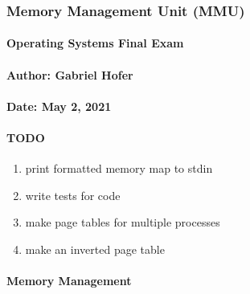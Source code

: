 \hypertarget{memory-management-unit-mmu}{%
\subsubsection{Memory Management Unit
(MMU)}\label{memory-management-unit-mmu}}

\hypertarget{operating-systems-final-exam}{%
\paragraph{Operating Systems Final
Exam}\label{operating-systems-final-exam}}

\hypertarget{author-gabriel-hofer}{%
\paragraph{Author: Gabriel Hofer}\label{author-gabriel-hofer}}

\hypertarget{date-may-2-2021}{%
\paragraph{Date: May 2, 2021}\label{date-may-2-2021}}

\hypertarget{todo}{%
\paragraph{TODO}\label{todo}}

\begin{enumerate}
\def\labelenumi{\arabic{enumi}.}
\tightlist
\item
  print formatted memory map to stdin
\item
  write tests for code
\item
  make page tables for multiple processes
\item
  make an inverted page table
\end{enumerate}

\hypertarget{memory-management}{%
\paragraph{Memory Management}\label{memory-management}}

